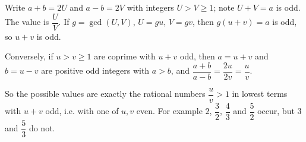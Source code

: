 Write $a+b=2U$ and $a-b=2V$ with integers $U>V\ge1$; note $U+V=a$ is odd. The value is $\dfrac UV$. If $g=\gcd(U,V)$, $U=gu$, $V=gv$, then $g(u+v)=a$ is odd, so $u+v$ is odd.

Conversely, if $u>v\ge1$ are coprime with $u+v$ odd, then $a=u+v$ and $b=u-v$ are positive odd integers with $a>b$, and $\dfrac{a+b}{a-b}=\dfrac{2u}{2v}=\dfrac uv$.

So the possible values are exactly the rational numbers $\dfrac uv>1$ in lowest terms with $u+v$ odd, i.e. with one of $u,v$ even. For example $2$, $\dfrac32$, $\dfrac43$ and $\dfrac52$ occur, but $3$ and $\dfrac53$ do not.
